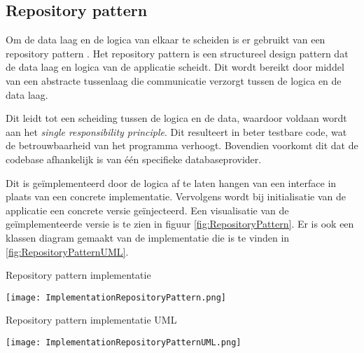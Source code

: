 \subsection{Repository pattern}
Om de data laag en de logica van elkaar te scheiden is er gebruikt van een repository pattern \parencite{RepositoryPattern}.
Het repository pattern is een structureel design pattern dat de data laag en logica van de applicatie scheidt.
Dit wordt bereikt door middel van een abstracte tussenlaag die communicatie verzorgt tussen de logica en de data laag.

\whitespace
Dit leidt tot een scheiding tussen de logica en de data, waardoor voldaan wordt aan het \textit{single responsibility principle}.
Dit resulteert in beter testbare code, wat de betrouwbaarheid van het programma verhoogt.
Bovendien voorkomt dit dat de codebase afhankelijk is van één specifieke databaseprovider.

\whitespace
Dit is geïmplementeerd door de logica af te laten hangen van een interface in plaats van een concrete implementatie.
Vervolgens wordt bij initialisatie van de applicatie  een concrete versie geïnjecteerd.
Een visualisatie van de geïmplementeerde versie is te zien in figuur \ref{fig:RepositoryPattern}.
Er is ook een klassen diagram gemaakt van de implementatie die is te vinden in \ref{fig:RepositoryPatternUML}.

\whitespace[2]
\begin{graphic}
    \captionsetup{type=figure}
    \caption{Repository pattern implementatie}
    \texttt{[image: ImplementationRepositoryPattern.png]}
    \label{fig:RepositoryPattern}
\end{graphic}

\begin{graphic}
    \captionsetup{type=figure}
    \caption{Repository pattern implementatie UML}
    \texttt{[image: ImplementationRepositoryPatternUML.png]}
    \label{fig:RepositoryPatternUML}
\end{graphic}
